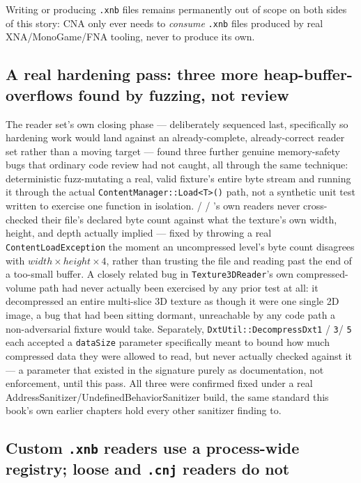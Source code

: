 Writing or producing \texttt{.xnb} files remains permanently out of scope on both sides of
this story: CNA only ever needs to \emph{consume} \texttt{.xnb} files produced by real
XNA/MonoGame/FNA tooling, never to produce its own.

\subsection{A real hardening pass: three more heap-buffer-overflows found by fuzzing, not review}

The reader set's own closing phase --- deliberately sequenced last, specifically so hardening
work would land against an already-complete, already-correct reader set rather than a moving
target --- found three further genuine memory-safety bugs that ordinary code review had not
caught, all through the same technique: deterministic fuzz-mutating a real, valid fixture's
entire byte stream and running it through the actual \texttt{ContentManager::Load<T>()} path,
not a synthetic unit test written to exercise one function in isolation. /%
 / 's own readers never cross-checked their file's
declared byte count against what the texture's own width, height, and depth actually implied
--- fixed by throwing a real \texttt{ContentLoadException} the moment an uncompressed level's
byte count disagrees with $\mathit{width} \times \mathit{height} \times 4$, rather than
trusting the file and reading past the end of a too-small buffer. A closely related bug in
\texttt{Texture3DReader}'s own compressed-volume path had never actually been exercised by any
prior test at all: it decompressed an entire multi-slice 3D texture as though it were one
single 2D image, a bug that had been sitting dormant, unreachable by any code path a
non-adversarial fixture would take. Separately, \texttt{DxtUtil::DecompressDxt1} / \texttt{3}/%
\texttt{5} each accepted a \texttt{dataSize} parameter specifically meant to bound how much
compressed data they were allowed to read, but never actually checked against it --- a
parameter that existed in the signature purely as documentation, not enforcement, until this
pass. All three were confirmed fixed under a real AddressSanitizer/UndefinedBehaviorSanitizer
build, the same standard this book's own earlier chapters hold every other sanitizer finding
to.

\subsection{Custom \texttt{.xnb} readers use a process-wide registry; loose and \texttt{.cnj} readers do not}

